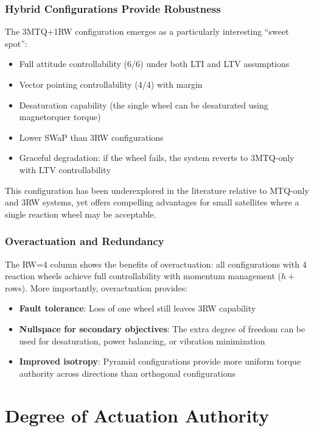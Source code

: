 \documentclass[conference]{IEEEtran}
\begin{document}
\subsubsection{Hybrid Configurations Provide Robustness}
The 3MTQ+1RW configuration emerges as a particularly interesting ``sweet spot'':
\begin{itemize}
    \item Full attitude controllability (6/6) under both LTI and LTV assumptions
    \item Vector pointing controllability (4/4) with margin
    \item Desaturation capability (the single wheel can be desaturated using magnetorquer torque)
    \item Lower SWaP than 3RW configurations
    \item Graceful degradation: if the wheel fails, the system reverts to 3MTQ-only with LTV controllability
\end{itemize}
This configuration has been underexplored in the literature relative to MTQ-only and 3RW systems, yet offers compelling advantages for small satellites where a single reaction wheel may be acceptable.

\subsubsection{Overactuation and Redundancy}
The RW=4 column shows the benefits of overactuation: all configurations with 4 reaction wheels achieve full controllability with momentum management ($h+$ rows). More importantly, overactuation provides:
\begin{itemize}
    \item \textbf{Fault tolerance}: Loss of one wheel still leaves 3RW capability
    \item \textbf{Nullspace for secondary objectives}: The extra degree of freedom can be used for desaturation, power balancing, or vibration minimization
    \item \textbf{Improved isotropy}: Pyramid configurations provide more uniform torque authority across directions than orthogonal configurations
\end{itemize}

\section{Degree of Actuation Authority}\label{sec:daa}
\end{document}
